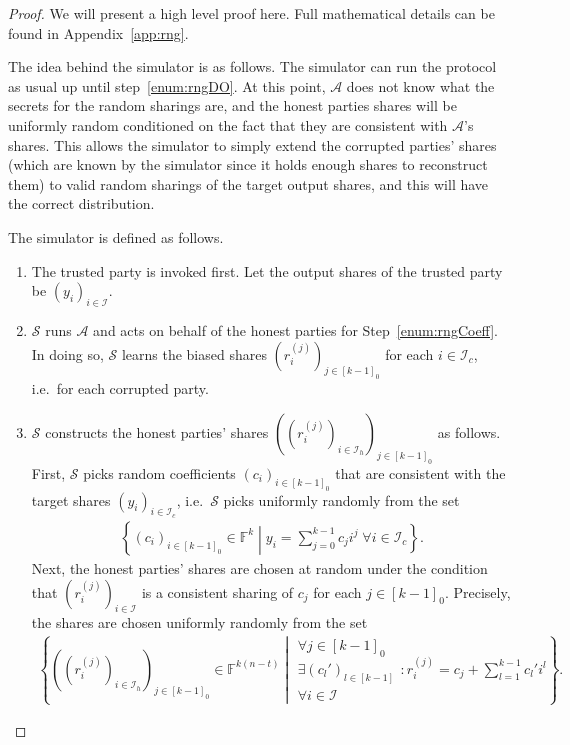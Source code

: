 \documentclass{article}
\newcommand{\set}[2]{\left\{ #1 \middle| #2 \right\}}
\newcommand{\seq}[1]{\left[#1\right]}
\newcommand{\seqZ}[1]{\left[#1\right]_0}
\theoremstyle{remark}
\newcommand{\F}{\mathbb{F}}
\begin{document}
\begin{proof}
	\newcommand{\proto}{\piRNG{n,k}}

	We will present a high level proof here. Full mathematical details can be
	found in Appendix~\ref{app:rng}.

	The idea behind the simulator is as follows. The simulator can run the
	protocol as usual up until step~\ref{enum:rngDO}. At this point,
	$\mathcal{A}$ does not know what the secrets for the random sharings are,
	and the honest parties shares will be uniformly random conditioned on the
	fact that they are consistent with $\mathcal{A}$'s shares. This allows the
	simulator to simply extend the corrupted parties' shares (which are known
	by the simulator since it holds enough shares to reconstruct them) to valid
	random sharings of the target output shares, and this will have the correct
	distribution.

	The simulator is defined as follows.
	\begin{enumerate}
		\item The trusted party is invoked first. Let the output shares of the
			trusted party be ${(y_i)}_{i \in \mathcal{I}}$.

		\item $\mathcal{S}$ runs $\mathcal{A}$ and acts on behalf of the honest
			parties for Step~\ref{enum:rngCoeff}. In doing so, $\mathcal{S}$
			learns the biased shares ${\left(r_i^{(j)}\right)}_{j \in
			\seqZ{k-1}}$ for each $i \in \mathcal{I}_c$, i.e.\ for each
			corrupted party.

		\item $\mathcal{S}$ constructs the honest parties' shares
			${\left({\left(r_i^{(j)}\right)}_{i \in \mathcal{I}_h}\right)}_{j
			\in \seqZ{k-1}}$ as follows. First, $\mathcal{S}$ picks random
			coefficients ${(c_i)}_{i \in \seqZ{k-1}}$ that are consistent with
			the target shares ${(y_i)}_{i \in \mathcal{I}_c}$, i.e.\
			$\mathcal{S}$ picks uniformly randomly from the set
			\begin{align*}
				\set{%
					{(c_i)}_{i \in \seqZ{k-1}} \in \F^k
				}{%
					y_i = \sum_{j=0}^{k-1} c_j i^j
					\;
					\forall i \in \mathcal{I}_c
				}.
			\end{align*}
			Next, the honest parties' shares are chosen at random under the
			condition that ${\left(r_i^{(j)}\right)}_{i \in \mathcal{I}}$ is a
			consistent sharing of $c_j$ for each $j \in \seqZ{k-1}$. Precisely,
			the shares are chosen uniformly randomly from the set
			\begin{align*}
				\set{%
					{\left(
						{\left(
							r_i^{(j)}
						\right)}_{i \in \mathcal{I}_h}\right)
					}_{j \in \seqZ{k-1}}
					\in
					\F^{k(n-t)}
				}{%
					\begin{matrix}
						\forall j \in \seqZ{k-1}\\
						\exists {(c_l')}_{l \in \seq{k-1}}\\
						\forall i \in \mathcal{I}
					\end{matrix}
					:
					r_i^{(j)} = c_j + \sum_{l=1}^{k-1} c_l' i^l
				}.
			\end{align*}
	\end{enumerate}


\end{proof}
\end{document}
